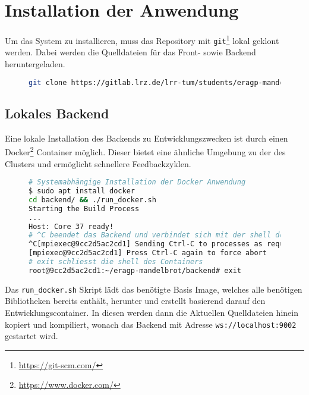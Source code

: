 \section{Installation der Anwendung}

Um das System zu installieren, muss das Repository mit \verb|git|\footnote{\url{https://git-scm.com/}} lokal geklont werden. Dabei werden die Quelldateien für
das Front- sowie Backend heruntergeladen.

\begin{figure}[h!]
	\begin{lstlisting}[language=bash, caption={Klonen des Repositorys}]
git clone https://gitlab.lrz.de/lrr-tum/students/eragp-mandelbrot.git
        \end{lstlisting}
\end{figure}

\subsection{Lokales Backend}
Eine lokale Installation des Backends zu Entwicklungszwecken ist durch einen Docker\footnote{\url{https://www.docker.com/}} Container möglich.
Dieser bietet eine ähnliche Umgebung zu der des Clusters und ermöglicht schnellere Feedbackzyklen.

\begin{figure}[h!]
	\begin{lstlisting}[language=bash, caption={Starten der Entwicklungsumbegung des Backends}]
# Systemabhängige Installation der Docker Anwendung
$ sudo apt install docker
cd backend/ && ./run_docker.sh
Starting the Build Process
...
Host: Core 37 ready!
# ^C beendet das Backend und verbindet sich mit der shell des Containers
^C[mpiexec@9cc2d5ac2cd1] Sending Ctrl-C to processes as requested
[mpiexec@9cc2d5ac2cd1] Press Ctrl-C again to force abort
# exit schliesst die shell des Containers
root@9cc2d5ac2cd1:~/eragp-mandelbrot/backend# exit
        \end{lstlisting}
\end{figure}

Das \verb|run_docker.sh| Skript lädt das benötigte Basis Image, welches alle benötigen Bibliotheken bereits enthält, herunter und erstellt basierend darauf
den Entwicklungscontainer. In diesen werden dann die Aktuellen Quelldateien hinein kopiert und kompiliert, wonach das Backend mit Adresse
\verb|ws://localhost:9002| gestartet wird.

